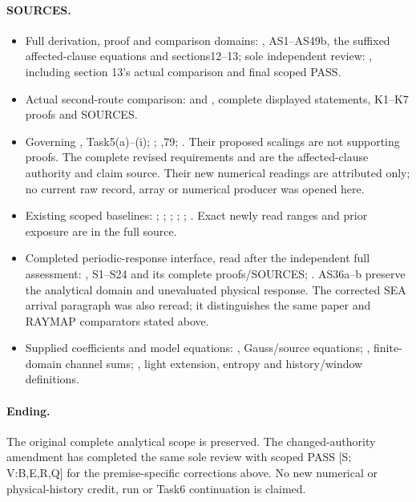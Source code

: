 \documentclass[10pt]{article}
\begin{document}
\paragraph{SOURCES.}
\begin{itemize}
\item Full derivation, proof and comparison domains:
,
AS1--AS49b, the suffixed affected-clause equations and
sections12--13; sole independent review:
,
including section 13's actual comparison and final scoped PASS.
\item Actual second-route comparison:
and
,
complete displayed statements, K1--K7 proofs and SOURCES.
\item Governing
,
Task5(a)--(i);
;
,79;
.
Their proposed scalings are not supporting proofs.
The complete revised requirements and
are the affected-clause authority and claim source. Their
new numerical readings are attributed only; no current
raw record, array or numerical producer was opened here.
\item Existing scoped baselines:
;
;
;
;
;
.
Exact newly read ranges and prior exposure are in the full source.
\item Completed periodic-response interface, read after the
independent full assessment:
,
S1--S24 and its complete proofs/SOURCES;
.
AS36a--b preserve the analytical domain and unevaluated
physical response. The corrected SEA arrival paragraph
was also reread; it distinguishes the same paper and
RAYMAP comparators stated above.
\item Supplied coefficients and model equations:
,
Gauss/source equations;
,
finite-domain channel sums;
,
light extension, entropy and history/window definitions.
\end{itemize}
\paragraph{Ending.}
The original complete analytical scope is preserved.
The changed-authority amendment has completed the same sole
review with scoped PASS [S; V:B,E,R,Q] for the premise-specific
corrections above.
No new numerical or physical-history credit,
run or Task6 continuation is claimed.
\end{document}
